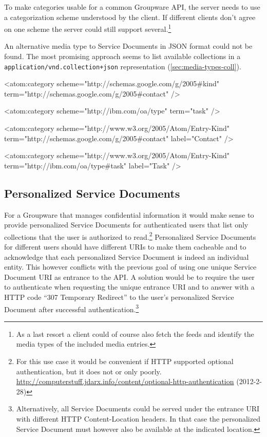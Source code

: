 \documentclass[11pt,a4paper,headsepline,twoside]{scrartcl}		%
\newcommand{\citeurl}[2]{\url{#1} (#2)}
\begin{document}
To make categories usable for a common Groupware API, the server needs to use a
categorization scheme understood by the client. If different clients don't agree
on one scheme the server could still support several.\footnote{As a last resort
  a client could of course also fetch the feeds and identify the media types of
  the included media entries.}

An alternative media type to Service Documents in JSON format could not be
found. The most promising approach seems to list available collections in a
\lstinline:application/vnd.collection+json: representation
(\autoref{sec:media-types-coll}).

\begin{anylisting}[label=fig:atom-category,
                   caption={ATOM categories as used by Google and IBM to mark entry
                            types and a proposal to use a standard scheme URI for type terms}]
<atom:category
    scheme="http://schemas.google.com/g/2005#kind"
    term="http://schemas.google.com/g/2005#contact" />

<atom:category 
    scheme="http://ibm.com/oa/type"
    term="task" />

<atom:category 
    scheme="http://www.w3.org/2005/Atom/Entry-Kind"
    term="http://schemas.google.com/g/2005#contact"
    label="Contact" />

<atom:category
     scheme="http://www.w3.org/2005/Atom/Entry-Kind"
     term="http://ibm.com/oa/type#task"
     label="Task" />
\end{anylisting}

\subsection{Personalized Service Documents} For a Groupware that manages
confidential information it would make sense to provide personalized Service
Documents for authenticated users that list only collections that the user is
authorized to read.\footnote{For this use case it would be convenient if HTTP
  supported optional authentication, but it does not or only
  poorly. \citeurl{http://computerstuff.jdarx.info/content/optional-http-authentication}{2012-2-28}}
Personalized Service Documents for different users should have different URIs to
make them cacheable and to acknowledge that each personalized Service Document
is indeed an individual entity. This however conflicts with the previous goal of
using one unique Service Document URI as entrance to the API. A solution would
be to require the user to authenticate when requesting the unique entrance URI
and to answer with a HTTP code ``307 Temporary Redirect'' to the user's
personalized Service Document after successful
authentication.\footnote{Alternatively, all Service Documents could be served under
  the entrance URI with different HTTP Content-Location
  headers\cite[sec. 14.14]{RFC2616}. In that case the personalized Service
  Document must however also be available at the indicated location.}
\end{document}
